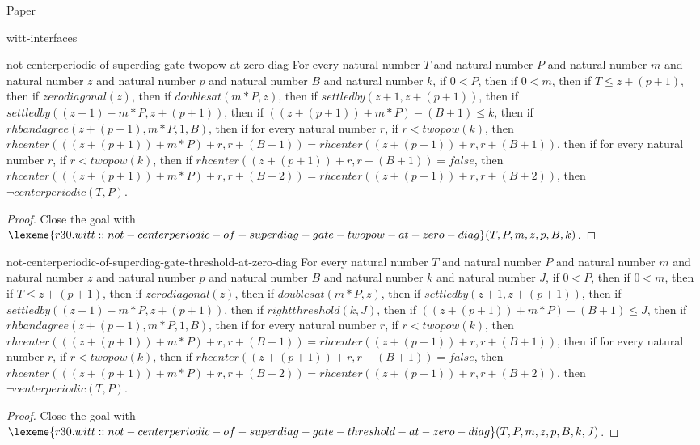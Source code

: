 \begin{lexlean}{Paper}
\begin{section}{witt-interfaces}
  \begin{theorem}{not-centerperiodic-of-superdiag-gate-twopow-at-zero-diag}
  For every natural number \(T\) and natural number \(P\) and natural number \(m\) and natural number \(z\) and natural number \(p\) and natural number \(B\) and natural number \(k\), if \(0 < P\), then if \(0 < m\), then if \(T ≤ z + (p + 1)\), then if \(zerodiagonal(z)\), then if \(doublesat(m * P, z)\), then if \(settledby(z + 1, z + (p + 1))\), then if \(settledby((z + 1) - m * P, z + (p + 1))\), then if \(((z + (p + 1)) + m * P) - (B + 1) ≤ k\), then if \(rhbandagree(z + (p + 1), m * P, 1, B)\), then if for every natural number \(r\), if \(r < twopow(k)\), then \(rhcenter(((z + (p + 1)) + m * P) + r, r + (B + 1)) = rhcenter((z + (p + 1)) + r, r + (B + 1))\), then if for every natural number \(r\), if \(r < twopow(k)\), then if \(rhcenter((z + (p + 1)) + r, r + (B + 1)) = false\), then \(rhcenter(((z + (p + 1)) + m * P) + r, r + (B + 2)) = rhcenter((z + (p + 1)) + r, r + (B + 2))\), then \(¬ centerperiodic(T, P)\).
  \begin{proof}
  Close the goal with \(\lexeme{r30.witt::not-centerperiodic-of-superdiag-gate-twopow-at-zero-diag}(T, P, m, z, p, B, k)\).
  \end{proof}
  \end{theorem}

  \begin{theorem}{not-centerperiodic-of-superdiag-gate-threshold-at-zero-diag}
  For every natural number \(T\) and natural number \(P\) and natural number \(m\) and natural number \(z\) and natural number \(p\) and natural number \(B\) and natural number \(k\) and natural number \(J\), if \(0 < P\), then if \(0 < m\), then if \(T ≤ z + (p + 1)\), then if \(zerodiagonal(z)\), then if \(doublesat(m * P, z)\), then if \(settledby(z + 1, z + (p + 1))\), then if \(settledby((z + 1) - m * P, z + (p + 1))\), then if \(rightthreshold(k, J)\), then if \(((z + (p + 1)) + m * P) - (B + 1) ≤ J\), then if \(rhbandagree(z + (p + 1), m * P, 1, B)\), then if for every natural number \(r\), if \(r < twopow(k)\), then \(rhcenter(((z + (p + 1)) + m * P) + r, r + (B + 1)) = rhcenter((z + (p + 1)) + r, r + (B + 1))\), then if for every natural number \(r\), if \(r < twopow(k)\), then if \(rhcenter((z + (p + 1)) + r, r + (B + 1)) = false\), then \(rhcenter(((z + (p + 1)) + m * P) + r, r + (B + 2)) = rhcenter((z + (p + 1)) + r, r + (B + 2))\), then \(¬ centerperiodic(T, P)\).
  \begin{proof}
  Close the goal with \(\lexeme{r30.witt::not-centerperiodic-of-superdiag-gate-threshold-at-zero-diag}(T, P, m, z, p, B, k, J)\).
  \end{proof}
  \end{theorem}


\end{section}
\end{lexlean}

